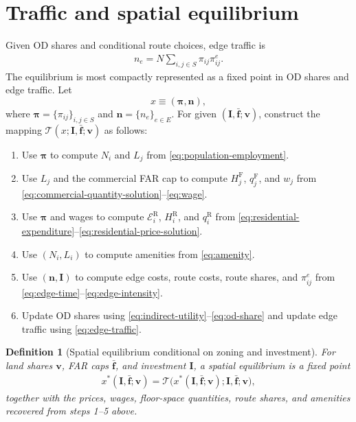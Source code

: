 \documentclass[12pt,a4paper]{article}
\newtheorem{definition}{Definition}
\newcommand{\R}{\mathrm{R}}
\newcommand{\F}{\mathrm{F}}
\newcommand{\1}{\mathbb 1}
\begin{document}
\section{Traffic and spatial equilibrium}

Given OD shares and conditional route choices, edge traffic is
\begin{align}
n_e
=
N\sum_{i,j\in S}\pi_{ij}\pi_{ij}^{e}.
\label{eq:edge-traffic}
\end{align}
The equilibrium is most compactly represented as a fixed point in OD shares and edge traffic. Let
\[
x\equiv(\boldsymbol\pi,\mathbf n),
\]
where $\boldsymbol\pi=\{\pi_{ij}\}_{i,j\in S}$ and $\mathbf n=\{n_e\}_{e\in E}$. For given $(\mathbf I,\bar{\mathbf f};\mathbf v)$, construct the mapping $\mathcal T(x;\mathbf I,\bar{\mathbf f};\mathbf v)$ as follows:
\begin{enumerate}
\item Use $\boldsymbol\pi$ to compute $N_i$ and $L_j$ from \eqref{eq:population-employment}.
\item Use $L_j$ and the commercial FAR cap to compute $H_j^{\F}$, $q_j^{\F}$, and $w_j$ from \eqref{eq:commercial-quantity-solution}--\eqref{eq:wage}.
\item Use $\boldsymbol\pi$ and wages to compute $\mathcal E_i^{\R}$, $H_i^{\R}$, and $q_i^{\R}$ from \eqref{eq:residential-expenditure}--\eqref{eq:residential-price-solution}.
\item Use $(N_i,L_i)$ to compute amenities from \eqref{eq:amenity}.
\item Use $(\mathbf n,\mathbf I)$ to compute edge costs, route costs, route shares, and $\pi_{ij}^e$ from \eqref{eq:edge-time}--\eqref{eq:edge-intensity}.
\item Update OD shares using \eqref{eq:indirect-utility}--\eqref{eq:od-share} and update edge traffic using \eqref{eq:edge-traffic}.
\end{enumerate}

\begin{definition}[Spatial equilibrium conditional on zoning and investment]
For land shares $\mathbf v$, FAR caps $\bar{\mathbf f}$, and investment $\mathbf I$, a spatial equilibrium is a fixed point
\begin{align}
x^*(\mathbf I,\bar{\mathbf f};\mathbf v)
=
\mathcal T\bigl(x^*(\mathbf I,\bar{\mathbf f};\mathbf v);\mathbf I,\bar{\mathbf f};\mathbf v\bigr),
\label{eq:spatial-fixed-point}
\end{align}
together with the prices, wages, floor-space quantities, route shares, and amenities recovered from steps 1--5 above.
\end{definition}
\end{document}
